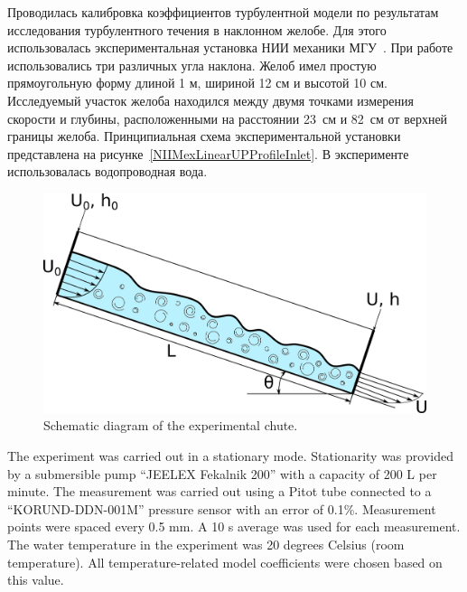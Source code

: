 \documentclass[mathematics,article,accept,pdftex,moreauthors]{Definitions/mdpi}
\begin{document}
Проводилась калибровка коэффициентов турбулентной модели по результатам исследования турбулентного течения в наклонном желобе. Для этого использовалась экспериментальная установка НИИ механики МГУ~\cite{fluids7030111}. При работе использовались три различных угла наклона. Желоб имел простую прямоугольную форму длиной 1 м, шириной 12 см и высотой 10 см. Исследуемый участок желоба находился между двумя точками измерения скорости и глубины, расположенными на расстоянии 23~см и 82~см от верхней границы желоба. Принципиальная схема экспериментальной установки представлена на рисунке~\ref{NIIMexLinearUPProfileInlet}. В эксперименте использовалась водопроводная вода.

\begin{figure}[H]
 
\includegraphics[width=10.5 cm]{NIIMexLinearUProfileInlet.png}
\caption{Schematic diagram of the experimental chute.\label{NIIMexLinearUProfileInlet}}
 
\end{figure}   
 

The experiment was carried out in a stationary mode. Stationarity was provided by a submersible pump ``JEELEX Fekalnik 200'' with a capacity of 200 L per minute. The measurement was carried out using a Pitot tube connected to a ``KORUND-DDN-001M'' pressure sensor with an error of 0.1\%. Measurement points were spaced every 0.5 mm. A 10 s average was used for each measurement. The water temperature in the experiment was 20 degrees Celsius (room temperature). All temperature-related model coefficients were chosen based on this value. 
\end{document}
